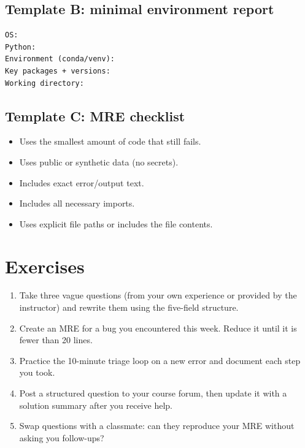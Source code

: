 \subsection{Template B: minimal environment report}
\begin{verbatim}
OS:
Python:
Environment (conda/venv):
Key packages + versions:
Working directory:
\end{verbatim}

\subsection{Template C: MRE checklist}
\begin{itemize}[noitemsep]
  \item Uses the smallest amount of code that still fails.
  \item Uses public or synthetic data (no secrets).
  \item Includes exact error/output text.
  \item Includes all necessary imports.
  \item Uses explicit file paths or includes the file contents.
\end{itemize}

\section{Exercises}
\begin{enumerate}[noitemsep]
  \item Take three vague questions (from your own experience or provided by the instructor) and rewrite them using the five-field structure.
  \item Create an MRE for a bug you encountered this week. Reduce it until it is fewer than 20 lines.
  \item Practice the 10-minute triage loop on a new error and document each step you took.
  \item Post a structured question to your course forum, then update it with a solution summary after you receive help.
  \item Swap questions with a classmate: can they reproduce your MRE without asking you follow-ups?
\end{enumerate}

